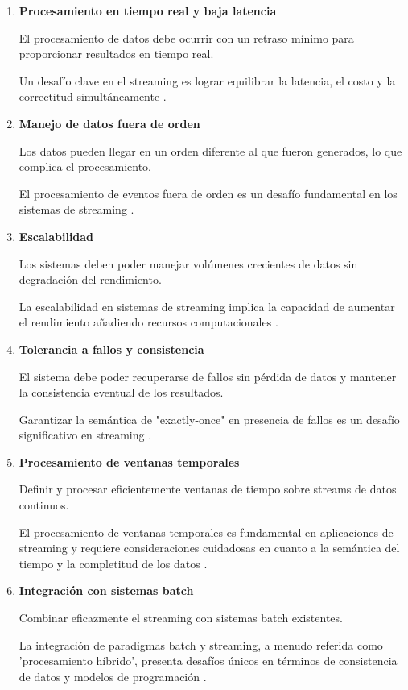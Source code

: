 \begin{enumerate}
    \item \textbf{Procesamiento en tiempo real y baja latencia}
    
    El procesamiento de datos debe ocurrir con un retraso mínimo para proporcionar resultados en tiempo real.
    
    Un desafío clave en el streaming es lograr equilibrar la latencia, el costo y la correctitud simultáneamente \parencite{akidau2015dataflow}.

    \item \textbf{Manejo de datos fuera de orden}
    
    Los datos pueden llegar en un orden diferente al que fueron generados, lo que complica el procesamiento.
    
    El procesamiento de eventos fuera de orden es un desafío fundamental en los sistemas de streaming \parencite[p.~87]{flink}.

    \item \textbf{Escalabilidad}
    
    Los sistemas deben poder manejar volúmenes crecientes de datos sin degradación del rendimiento.
    
    La escalabilidad en sistemas de streaming implica la capacidad de aumentar el rendimiento añadiendo recursos computacionales \parencite{samurai}.

    \newpage
    \item \textbf{Tolerancia a fallos y consistencia}
    
    El sistema debe poder recuperarse de fallos sin pérdida de datos y mantener la consistencia eventual de los resultados.
    
    Garantizar la semántica de "exactly-once" en presencia de fallos es un desafío significativo en streaming \parencite{carbone2015apache}.

    \item \textbf{Procesamiento de ventanas temporales}
    
    Definir y procesar eficientemente ventanas de tiempo sobre streams de datos continuos.
    
    El procesamiento de ventanas temporales es fundamental en aplicaciones de streaming y requiere consideraciones cuidadosas en cuanto a la semántica del tiempo y la completitud de los datos \parencite{akidau2015dataflow}.

    \item \textbf{Integración con sistemas batch}
    
    Combinar eficazmente el streaming con sistemas batch existentes.
    
    La integración de paradigmas batch y streaming, a menudo referida como 'procesamiento híbrido', presenta desafíos únicos en términos de consistencia de datos y modelos de programación \parencite{carbone2015apache}.
\end{enumerate}
\newpage
